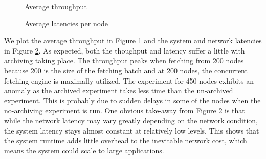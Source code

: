 \begin{figure}[th]
\begin{center}
\caption{Average throughput}
\label{fig:throughput}
\end{center}
\end{figure}

\begin{figure}[th]
\begin{center}
\caption{Average latencies per node}
\label{fig:latency}
\end{center}
\end{figure}

We plot the average throughput in Figure \ref{fig:throughput}
and the system and network latencies in Figure \ref{fig:latency}. 
As expected, both the thoughput and latency suffer a little with 
archiving taking place. The throughput peaks when fetching from
200 nodes because 200 is the size of the fetching batch and
at 200 nodes, the concurrent fetching engine is maximally utilized.
The experiment for 450 nodes exhibits an anomaly as the archived
experiment takes less time than the un-archived experiment.
This is probably due to sudden delays in some of the nodes when the
no-archiving experiment is run. One obvious take-away from
Figure \ref{fig:latency} is that while the network latency may
vary greatly depending on the network condition, the system latency
stays almost constant at relatively low levels. This shows that
the \padsd{} system runtime adds little overhead to the 
inevitable network cost, which means the system could scale to
large applications. 

